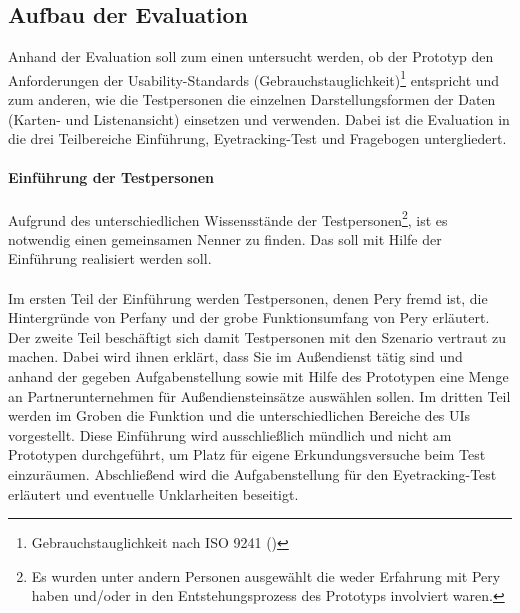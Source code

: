 \documentclass[Bachelorarbeit.tex]{subfiles}
\begin{document}
\subsection{Aufbau der Evaluation}
Anhand der Evaluation soll zum einen untersucht werden, ob der Prototyp den Anforderungen der Usability-Standards (Gebrauchstauglichkeit)\footnote{Gebrauchstauglichkeit nach ISO 9241 (\cite[siehe:][Abs.: 3.1 Gebrauchstauglichkeit]{Iso9241_11})} entspricht und zum anderen, wie die Testpersonen die einzelnen Darstellungsformen der Daten (Karten- und Listenansicht) einsetzen und verwenden.
Dabei ist die Evaluation in die drei Teilbereiche Einführung, Eyetracking-Test und Fragebogen untergliedert.

\paragraph{Einführung der Testpersonen}
Aufgrund des unterschiedlichen Wissensstände der Testpersonen\footnote{Es wurden unter andern Personen ausgewählt die weder Erfahrung mit Pery haben und/oder in den Entstehungsprozess des Prototyps involviert waren.}, ist es notwendig einen gemeinsamen Nenner zu finden. Das soll mit Hilfe der Einführung realisiert werden soll.\\
\\
Im ersten Teil der Einführung werden Testpersonen, denen Pery fremd ist, die Hintergründe von Perfany und der grobe Funktionsumfang von Pery erläutert.
Der zweite Teil beschäftigt sich damit Testpersonen mit den Szenario vertraut zu machen.
Dabei wird ihnen erklärt, dass Sie im Außendienst tätig sind und anhand der gegeben Aufgabenstellung sowie mit Hilfe des Prototypen eine Menge an Partnerunternehmen für Außendiensteinsätze auswählen sollen.
Im dritten Teil werden im Groben die Funktion und die unterschiedlichen Bereiche des \ac{UI}s vorgestellt. 
Diese Einführung wird ausschließlich mündlich und nicht am Prototypen durchgeführt, um Platz für eigene Erkundungsversuche beim Test einzuräumen.
Abschließend wird die Aufgabenstellung für den Eyetracking-Test erläutert und eventuelle Unklarheiten beseitigt.
\end{document}
